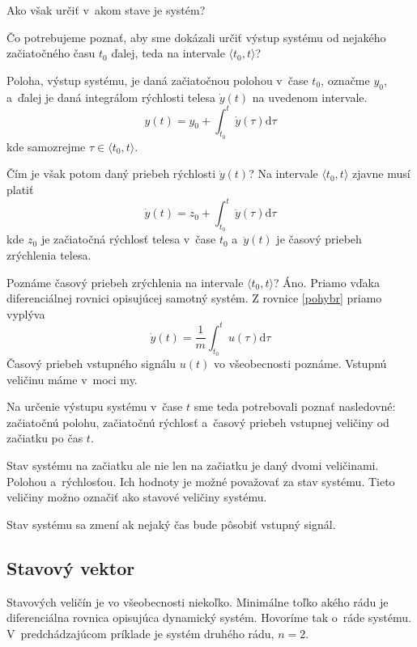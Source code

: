 \documentclass[a4paper, 10pt, ]{article}
\begin{document}
Ako však určiť v~akom stave je systém? 

Čo potrebujeme poznať, aby sme dokázali určiť výstup systému od nejakého začiatočného času $t_0$ ďalej, teda na intervale $\langle t_0, t \rangle$?

Poloha, výstup systému, je daná začiatočnou polohou v~čase $t_0$, označme $y_0$, a~ďalej je daná integrálom rýchlosti telesa $\dot y(t)$ na uvedenom intervale.
\begin{equation}
    y(t) = y_0 + \int_{t_0}^{t}\dot y(\tau) \text{d}\tau
\end{equation}
kde samozrejme $\tau \in \langle t_0, t \rangle$.

Čím je však potom daný priebeh rýchlosti $\dot y(t)$? Na intervale $\langle t_0, t \rangle$ zjavne musí platiť
\begin{equation}
    \dot y(t) = z_0 + \int_{t_0}^{t}\ddot y(\tau) \text{d}\tau
\end{equation}
kde $z_0$ je začiatočná rýchlosť telesa v~čase $t_0$ a~$\ddot y(t)$ je časový priebeh zrýchlenia telesa. 

Poznáme časový priebeh zrýchlenia na intervale $\langle t_0, t \rangle$? Áno. Priamo vďaka diferenciálnej rovnici opisujúcej samotný systém. Z rovnice \eqref{pohybr} priamo vyplýva
\begin{equation}
    \dot y(t) = \frac{1}{m} \int_{t_0}^{t}  u(\tau) \text{d}\tau
\end{equation}
Časový priebeh vstupného signálu $u(t)$ vo všeobecnosti poznáme. Vstupnú veličinu máme v~moci my.

Na určenie výstupu systému v~čase $t$ sme teda potrebovali poznať nasledovné: začiatočnú polohu, začiatočnú rýchlosť a~časový priebeh vstupnej veličiny od začiatku po čas $t$.

Stav systému na začiatku ale nie len na začiatku je daný dvomi veličinami. Polohou a~rýchlosťou. Ich hodnoty je možné považovať za stav systému. Tieto veličiny možno označiť ako stavové veličiny systému.

Stav systému sa zmení ak nejaký čas bude pôsobiť vstupný signál.



\subsection{Stavový vektor}

Stavových veličín je vo všeobecnosti niekoľko. Minimálne toľko akého rádu je diferenciálna rovnica opisujúca dynamický systém. Hovoríme tak o~ráde systému. V~predchádzajúcom príklade je systém  druhého rádu, $n=2$.
\end{document}
